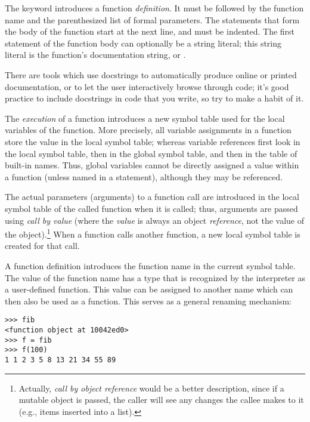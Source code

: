 \documentclass{manual}
\begin{document}
The keyword  introduces a function \emph{definition}.  It
must be followed by the function name and the parenthesized list of
formal parameters.  The statements that form the body of the function
start at the next line, and must be indented.  The first statement of
the function body can optionally be a string literal; this string
literal is the function's documentation
string, or .

There are tools which use docstrings to automatically produce online
or printed documentation, or to let the user interactively browse
through code; it's good practice to include docstrings in code that
you write, so try to make a habit of it.

The \emph{execution} of a function introduces a new symbol table used
for the local variables of the function.  More precisely, all variable
assignments in a function store the value in the local symbol table;
whereas variable references first look in the local symbol table, then
in the global symbol table, and then in the table of built-in names.
Thus,  global variables cannot be directly assigned a value within a
function (unless named in a  statement), although
they may be referenced.

The actual parameters (arguments) to a function call are introduced in
the local symbol table of the called function when it is called; thus,
arguments are passed using \emph{call by value} (where the
\emph{value} is always an object \emph{reference}, not the value of
the object).\footnote{
         Actually, \emph{call by object reference} would be a better
         description, since if a mutable object is passed, the caller
         will see any changes the callee makes to it (e.g., items
         inserted into a list).
} When a function calls another function, a new local symbol table is
created for that call.

A function definition introduces the function name in the current
symbol table.  The value of the function name
has a type that is recognized by the interpreter as a user-defined
function.  This value can be assigned to another name which can then
also be used as a function.  This serves as a general renaming
mechanism:

\begin{verbatim}
>>> fib
<function object at 10042ed0>
>>> f = fib
>>> f(100)
1 1 2 3 5 8 13 21 34 55 89
\end{verbatim}
\end{document}
